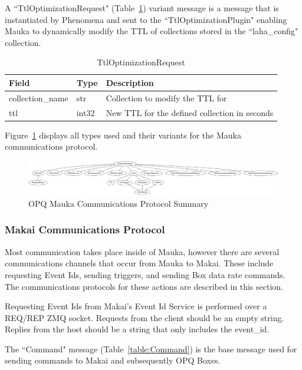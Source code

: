 A ``TtlOptimizationRequest" (Table~\ref{table:TtlOptimizationRequest}) variant message is a message that is instantiated by Phenomena and sent to the ``TtlOptimizationPlugin" enabling Mauka to dynamically modify the TTL of collections stored in the ``laha\_config" collection.

\begin{table}[H]
	\centering
	\caption{TtlOptimizationRequest}
	\begin{tabularx}{\textwidth}{llX}
		\toprule
		\textbf{Field} & \textbf{Type} & \textbf{Description} \\
		\midrule
		collection\_name & str & Collection to modify the TTL for \\
		ttl & int32 & New TTL for the defined collection in seconds \\
		\bottomrule
	\end{tabularx}
	\label{table:TtlOptimizationRequest}
\end{table}

Figure~\ref{fig:mauka_messages} displays all types used and their variants for the Mauka communications protocol.

\begin{figure}
	\centering
	\includegraphics[width=\linewidth]{figures/mauka_messages.png}
	\caption{OPQ Mauka Communications Protocol Summary}
	\label{fig:mauka_messages}
\end{figure}

\subsubsection{Makai Communications Protocol}

Most communication takes place inside of Mauka, however there are several communications channels that occur from Mauka to Makai. These include requesting Event Ids, sending triggers, and sending Box data rate commands. The communications protocols for these actions are described in this section.

Requesting Event Ids from Makai's Event Id Service is performed over a REQ/REP ZMQ socket. Requests from the client should be an empty string. Replies from the host should be a string that only includes the event\_id.

The ``Command" message (Table~\ref{table:Command}) is the base message used for sending commands to Makai and subsequently OPQ Boxes.

